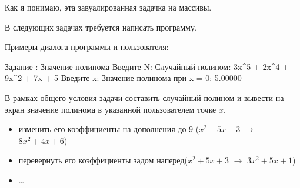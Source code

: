 
Как я понимаю, эта завуалированная задачка на массивы.

В следующих задачах требуется написать программу, 

Примеры диалога программы и пользователя:

\begin{zzoutput}
  Задание : Значение полинома
  Введите N: 
  Случайный полином: 3x^5 + 2x^4 + 9x^2 + 7x + 5
  Введите x: 
  Значение полинома при x = 0: 5.00000
\end{zzoutput}


\begin{zztask}
В рамках общего условия задачи составить случайный полином и вывести на экран
значение полинома в указанной пользователем точке $x$.
\end{zztask}

\begin{itemize}
\item изменить его коэффициенты на дополнения до 9 ($x^2+5x+3$ $\rightarrow$ $8x^2+4x+6$)
\item перевернуть его коэффициенты задом наперед($x^2+5x+3$ $\rightarrow$ $3x^2+5x+1$)
\item \dots
\end{itemize}
